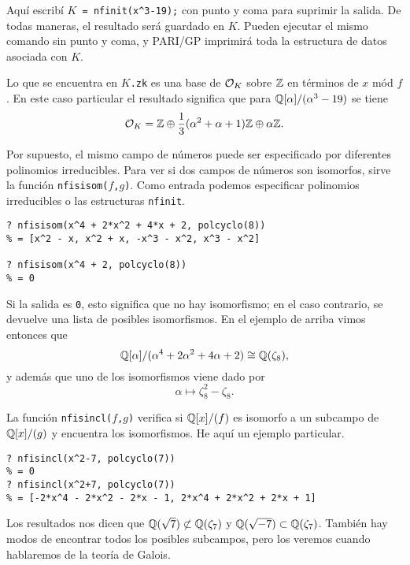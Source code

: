 Aquí escribí \texttt{$K$~=~nfinit(x\textasciicircum{}3-19);} con punto y coma para
suprimir la salida. De todas maneras, el resultado será guardado en $K$. Pueden
ejecutar el mismo comando sin punto y coma, y PARI/GP imprimirá toda
la estructura de datos asociada con $K$.

Lo que se encuentra en \texttt{$K$.zk} es una base de $\mathcal{O}_K$ sobre $\mathbb{Z}$ en
términos de $x$ mód $f$. En este caso particular el resultado significa que
para $\mathbb{Q} [\alpha]/(\alpha^3 - 19)$ se tiene
$$\mathcal{O}_K = \mathbb{Z} \oplus \frac{1}{3} (\alpha^2 + \alpha + 1) \mathbb{Z} \oplus \alpha \mathbb{Z}.$$

Por supuesto, el mismo campo de números puede ser especificado por diferentes
polinomios irreducibles. Para ver si dos campos de números son isomorfos, sirve
la función \texttt{nfisisom($f$,$g$)}. Como entrada podemos especificar
polinomios irreducibles o las estructuras \texttt{nfinit}.

\begin{shaded}
\begin{verbatim}
? nfisisom(x^4 + 2*x^2 + 4*x + 2, polcyclo(8))
% = [x^2 - x, x^2 + x, -x^3 - x^2, x^3 - x^2]

? nfisisom(x^4 + 2, polcyclo(8))
% = 0
\end{verbatim}
\end{shaded}

Si la salida es \texttt{0}, esto significa que no hay isomorfismo; en el caso
contrario, se devuelve una lista de posibles isomorfismos. En el ejemplo de
arriba vimos entonces que
$$\mathbb{Q} [\alpha]/(\alpha^4 + 2 \alpha^2 + 4 \alpha + 2) \cong \mathbb{Q} (\zeta_8),$$
y además que uno de los isomorfismos viene dado por
$$\alpha \mapsto \zeta_8^2 - \zeta_8.$$

La función \texttt{nfisincl($f$,$g$)} verifica si $\mathbb{Q}[x]/(f)$ es isomorfo a un
subcampo de $\mathbb{Q}[x]/(g)$ y encuentra los isomorfismos. He aquí un ejemplo
particular.

\begin{shaded}
\begin{verbatim}
? nfisincl(x^2-7, polcyclo(7))
% = 0
? nfisincl(x^2+7, polcyclo(7))
% = [-2*x^4 - 2*x^2 - 2*x - 1, 2*x^4 + 2*x^2 + 2*x + 1]
\end{verbatim}
\end{shaded}

Los resultados nos dicen que $\mathbb{Q} (\sqrt{7}) \not\subset \mathbb{Q} (\zeta_7)$
y $\mathbb{Q} (\sqrt{-7}) \subset \mathbb{Q} (\zeta_7)$. También hay modos de encontrar todos
los posibles subcampos, pero los veremos cuando hablaremos de la teoría de
Galois.


